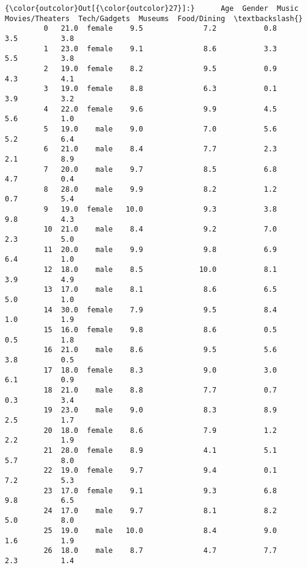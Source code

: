 \documentclass[11pt]{article}
\begin{document}
\begin{Verbatim}[commandchars=\\\{\}]
{\color{outcolor}Out[{\color{outcolor}27}]:}      Age  Gender  Music  Movies/Theaters  Tech/Gadgets  Museums  Food/Dining  \textbackslash{}
         0   21.0  female    9.5              7.2           0.8      3.5          3.8   
         1   23.0  female    9.1              8.6           3.3      5.5          3.8   
         2   19.0  female    8.2              9.5           0.9      4.3          4.1   
         3   19.0  female    8.8              6.3           0.1      3.9          3.2   
         4   22.0  female    9.6              9.9           4.5      5.6          1.0   
         5   19.0    male    9.0              7.0           5.6      5.2          6.4   
         6   21.0    male    8.4              7.7           2.3      2.1          8.9   
         7   20.0    male    9.7              8.5           6.8      4.7          0.4   
         8   28.0    male    9.9              8.2           1.2      0.7          5.4   
         9   19.0  female   10.0              9.3           3.8      9.8          4.3   
         10  21.0    male    8.4              9.2           7.0      2.3          5.0   
         11  20.0    male    9.9              9.8           6.9      6.4          1.0   
         12  18.0    male    8.5             10.0           8.1      3.9          4.9   
         13  17.0    male    8.1              8.6           6.5      5.0          1.0   
         14  30.0  female    7.9              9.5           8.4      1.0          1.9   
         15  16.0  female    9.8              8.6           0.5      0.5          1.8   
         16  21.0    male    8.6              9.5           5.6      3.8          0.5   
         17  18.0  female    8.3              9.0           3.0      6.1          0.9   
         18  21.0    male    8.8              7.7           0.7      0.3          3.4   
         19  23.0    male    9.0              8.3           8.9      2.5          1.7   
         20  18.0  female    8.6              7.9           1.2      2.2          1.9   
         21  28.0  female    8.9              4.1           5.1      5.7          8.0   
         22  19.0  female    9.7              9.4           0.1      7.2          5.3   
         23  17.0  female    9.1              9.3           6.8      9.8          6.5   
         24  17.0    male    9.7              8.1           8.2      5.0          8.0   
         25  19.0    male   10.0              8.4           9.0      1.6          1.9   
         26  18.0    male    8.7              4.7           7.7      2.3          1.4   

\end{Verbatim}
\end{document}
